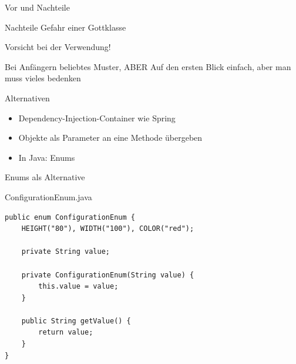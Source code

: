 \begin{frame}{Vor und Nachteile}
	\begin{alertblock}{Nachteile}
 		Gefahr einer \glqq Gottklasse\grqq
 	\end{alertblock}
\end{frame}

\begin{frame}{Vorsicht bei der Verwendung!}
	\begin{alertblock}{Bei Anfängern beliebtes Muster, ABER}
        Auf den ersten Blick einfach, aber man muss vieles bedenken
    \end{alertblock}
\end{frame}

\begin{frame}{Alternativen}
	\begin{itemize}
 		\item Dependency-Injection-Container wie Spring
 		\item Objekte als Parameter an eine Methode übergeben
 		\item In Java: Enums
 	\end{itemize}
\end{frame}

\begin{frame}[fragile]{Enums als Alternative}
	\begin{exampleblock}{ConfigurationEnum.java}
		\begin{lstlisting}
public enum ConfigurationEnum {
	HEIGHT("80"), WIDTH("100"), COLOR("red");
	
	private String value;
	
	private ConfigurationEnum(String value) {
		this.value = value;
	}
	
	public String getValue() {
		return value;
	}
}
		\end{lstlisting}
 	\end{exampleblock}
\end{frame}



